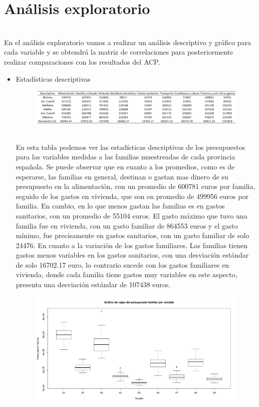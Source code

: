 \documentclass[report,oneside]{revcoles}
\begin{document}
\section{Análisis exploratorio}
~\\En el análisis exploratorio vamos a realizar un análisis descriptivo y gráfico para cada variable y se obtendrá la matriz de correlaciones para posteriormente realizar comparaciones con los resultados del ACP.
\begin{itemize}
\item Estadísticas descriptivas

\begin{figure}[h!]
  \centering
  \includegraphics[scale=0.52]{FigurasUV/desc.png}
\end{figure}

~\\En esta tabla podemos ver las estadísticas descriptivas de los presupuestos para las variables medidas a las familias muestreadas de cada provincia española. Se puede observar que en cuanto a los promedios, como es de esperarse, las familias en general, destinan o gastan mas dinero de su presupuesto en la alimentación, con un promedio de 600781 euros por familia, seguido de los gastos en vivienda, que son en promedio de 499956 euros por familia. En cambio, en lo que menos gastan las familias es en gastos sanitarios, con un promedio de 55104 euros. El gasto máximo que tuvo una familia fue en vivienda, con un gasto familiar de 864553 euros y el gasto mínimo, fue precisamente en gastos sanitarios, con un gasto familiar de solo 24476. En cuanto a la variación de los gastos familiares. Las familias tienen gastos menos variables en los gastos sanitarios, con una desviación estándar de solo 16702.17 euro, lo contrario sucede con los gastos familiares en vivienda, donde cada familia tiene gastos muy variables en este aspecto, presenta una desviación estándar de 107438 euros.
\begin{figure}[h!]
  \centering
  \includegraphics[scale=0.45]{FigurasUV/cajas.pdf}
\end{figure}


\end{itemize}
\end{document}
